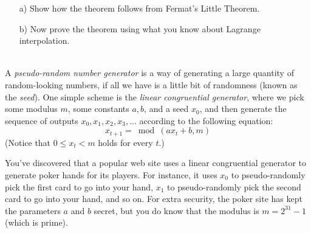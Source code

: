 \documentclass[]{article}
\newif\ifsolutions
\renewcommand{\answer}[1]{{\color{mydarkblue}\textbf{Solution:}#1}}
\begin{document}
\begin{qunlist}
\begin{enumerate}
\qpart
\item[a)] Show how the theorem follows from Fermat's Little Theorem. 
\qpart
\item[b)] Now prove the theorem using what you know about Lagrange interpolation.
\end{enumerate}


\ifsolutions{ \answer {
\begin{itemize}
\item[a)]
From Fermat's Little Theorem, we know $\forall x \not\equiv 0, \text{ } x^{p-1} \equiv 1 \pmod{p}$. \\
Multiplying both sides by $x$, and noting that $0^p \equiv 0 \pmod{p}$, we can see that 
\[
\forall x, \text{ } x^p \equiv x \pmod{p}
\]
Therefore, any $x^k$, where $k \geq p$ will be equivalent to $x^n$, where $n \in \{0, 1, \dots, p-1\}$, and will have a degree at most $p - 1$. 

\item[b)]
Since a polynomial $f$ of degree $d$ is described completely by $d + 1$ points, we cannot specify a polynomial of degree $\geq p$ because $f(p) = f(0)$ (and so forth for other values larger than $p$) over $GF(p)$. Thus, we can only specify at most $p$ unique points. Therefore, every polynomial is equivalent to a polynomial of degree at most $p - 1$.
\end{itemize}
}} \fi





\\   %
A \emph{pseudo-random number generator} is a way of generating a large quantity of random-looking numbers, if all we have is a little bit of randomness (known as the \emph{seed}). One simple scheme is the \emph{linear congruential generator}, where we pick some modulus $m$, some constants $a,b$, and a seed $x_0$, and then generate the sequence of outputs $x_0,x_1,x_2,x_3,\dots$ according to the following equation:
\[ 
x_{t+1} = \bmod(ax_t + b, m) 
\]
(Notice that $0 \le x_t < m$ holds for every $t$.)

You've discovered that a popular web site uses a linear congruential generator to generate poker hands for its players.  For instance, it uses $x_0$ to pseudo-randomly pick the first card to go into your hand, $x_1$ to pseudo-randomly pick the second card to go into your hand, and so on. For extra security, the poker site has kept the parameters $a$ and $b$ secret, but you do know that the modulus is $m=2^{31}-1$ (which is prime).


\end{qunlist}
\end{document}
